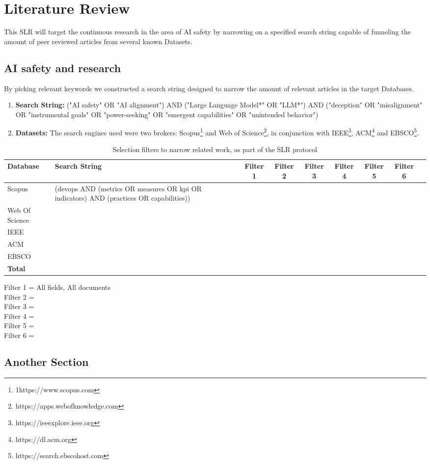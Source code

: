 \chapter{Literature Review}\label{chap:literature_review}

This SLR will target the continuous research in the area of AI safety by narrowing on a specified search string capable of funneling the amount of peer reviewed articles from several known Datasets.

\section{AI safety and research}

By picking relevant keywords we constructed a search string designed to narrow the amount of relevant articles in the target Databases.

\begin{enumerate}
    \item \textbf{Search String:} ("AI safety" OR "AI alignment") AND ("Large Language Model*" OR "LLM*") AND ("deception" OR "misalignment" OR "instrumental goals" OR "power-seeking" OR "emergent capabilities" OR "unintended behavior")
    \item \textbf{Datasets:} The search engines used were two brokers: Scopus\footnote{1https://www.scopus.com} and Web of Science\footnote{https://apps.webofknowledge.com}, in conjunction with IEEE\footnote{https://ieeexplore.ieee.org}, ACM\footnote{https://dl.acm.org} and EBSCO\footnote{https://search.ebscohost.com}.
\end{enumerate}


\begin{table}[h]
\centering
\caption{Selection filters to narrow related work, as part of the SLR protocol}
\label{tab:slr_filters}
\begin{tabular}{lp{5cm}ccccccc}
\toprule
\textbf{Database} & \textbf{Search String} & \textbf{Filter 1} & \textbf{Filter 2} & \textbf{Filter 3} & \textbf{Filter 4} & \textbf{Filter 5} & \textbf{Filter 6} \\
\midrule
Scopus & (devops AND (metrics OR measures OR kpi OR indicators) AND (practices OR capabilities)) & & & & & & \\
\midrule
Web Of Science & & & & & & & \\
\midrule
IEEE & & & & & & & \\
\midrule
ACM & & & & & & & \\
\midrule
EBSCO & & & & & & & \\
\midrule
\textbf{Total} & & & & & & & \\
\bottomrule
\end{tabular}
\end{table}

\vspace{1em}

\noindent
Filter 1 = All fields, All documents\\
Filter 2 = \\
Filter 3 = \\
Filter 4 = \\
Filter 5 = \\
Filter 6 = 


\section{Another Section}